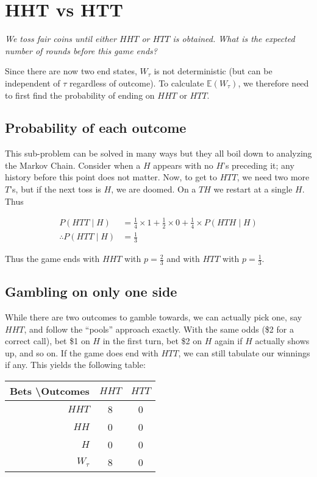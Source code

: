 \documentclass[11pt]{article}
\newcommand{\E}{\mathbb{E}}
\begin{document}
\section{HHT vs HTT}
\textit{We toss fair coins until either $HHT$ or $HTT$ is obtained. What is the expected number of rounds before this game ends?}

Since there are now two end states, $W_\tau$ is not deterministic (but can be independent of $\tau$ regardless of outcome). To calculate $\E(W_\tau)$, we therefore need to first find the probability of ending on $HHT$ or $HTT$.

\subsection{Probability of each outcome}
This sub-problem can be solved in many ways but they all boil down to analyzing the Markov Chain. Consider when a $H$ appears with no $H$'s preceding it; any history before this point does not matter. Now, to get to $HTT$, we need two more $T$'s, but if the next toss is $H$, we are doomed. On a $TH$ we restart at a single $H$. Thus 

\begin{align*}
P(HTT\mid H) &= \frac{1}{4} \times 1 + \frac{1}{2} \times 0 + \frac{1}{4} \times P(HTH\mid H) \\
\therefore P(HTT\mid H) &= \frac{1}{3}
\end{align*}

Thus the game ends with $HHT$ with $p=\frac{2}{3}$ and with $HTT$ with $p=\frac{1}{3}$.

\subsection{Gambling on only one side}
While there are two outcomes to gamble towards, we can actually pick one, say $HHT$, and follow the ``pools'' approach exactly. With the same odds (\$2 for a correct call), bet \$1 on $H$ in the first turn, bet \$2 on $H$ again if $H$ actually shows up, and so on. If the game does end with $HTT$, we can still tabulate our winnings if any. This yields the following table:

\begin{center}
  \begin{tabular}{ |r|c|c| } 
   \hline
   Bets \textbackslash Outcomes & $HHT$ & $HTT$ \\ \hline 
   $HHT$ & 8 & 0 \\ 
   $HH$ & 0 & 0 \\ 
   $H$ & 0 & 0 \\ \hline
   $W_\tau$ & 8 & 0 \\
   \hline
  \end{tabular}
\end{center}
\end{document}
